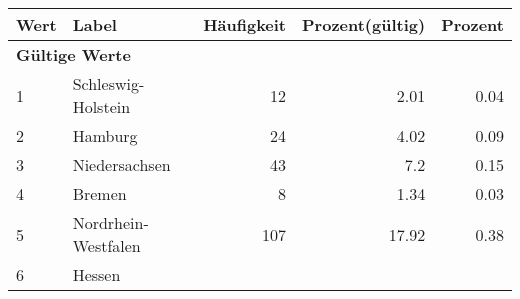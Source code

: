      \begin{longtable}{lXrrr}
     \toprule
     \textbf{Wert} & \textbf{Label} & \textbf{Häufigkeit} & \textbf{Prozent(gültig)} & \textbf{Prozent} \\
     \endhead
     \midrule
     \multicolumn{5}{l}{\textbf{Gültige Werte}}\\

     1 &
     \multicolumn{1}{X}{ Schleswig-Holstein   } &


       \num{12} &
       \num[round-mode=places,round-precision=2]{2.01} &
         \num[round-mode=places,round-precision=2]{0.04} \\

     2 &
     \multicolumn{1}{X}{ Hamburg   } &


       \num{24} &
       \num[round-mode=places,round-precision=2]{4.02} &
         \num[round-mode=places,round-precision=2]{0.09} \\

     3 &
     \multicolumn{1}{X}{ Niedersachsen   } &


       \num{43} &
       \num[round-mode=places,round-precision=2]{7.2} &
         \num[round-mode=places,round-precision=2]{0.15} \\

     4 &
     \multicolumn{1}{X}{ Bremen   } &


       \num{8} &
       \num[round-mode=places,round-precision=2]{1.34} &
         \num[round-mode=places,round-precision=2]{0.03} \\

     5 &
     \multicolumn{1}{X}{ Nordrhein-Westfalen   } &


       \num{107} &
       \num[round-mode=places,round-precision=2]{17.92} &
         \num[round-mode=places,round-precision=2]{0.38} \\

     6 &
     \multicolumn{1}{X}{ Hessen   } &



\end{longtable}
